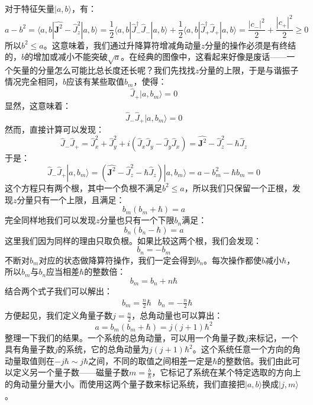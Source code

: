 \documentclass{ctexart}
\begin{document}
对于特征矢量$|a,b\rangle$，有：
\begin{equation}
a-b^2=\langle a,b|\hat{\bm{J}^2}-\hat{J}_z^2|a,b\rangle=\frac{1}{2}\langle a,b|\hat{J}_-^\dagger\hat{J}_-|a,b\rangle+\frac{1}{2}\langle a,b|\hat{J}_+^\dagger\hat{J}_+|a,b\rangle=\frac{|c_-|^2}{2}+\frac{|c_+|^2}{2}\geq 0
\end{equation}
所以$b^2\leq a$。这意味着，我们通过升降算符增减角动量$z$分量的操作必须是有终结的，$b$的增加或减小不能突破$\sqrt{a}$。在经典的图像中，这看起来好像是废话——一个矢量的分量怎么可能比总长度还长呢？我们先找找$z$分量的上限，于是与谐振子情况完全相同，$b$应该有某些取值$b_m$，使得：
\begin{equation}
\hat{J}_+|a,b_m\rangle=0
\end{equation}
显然，这意味着：
\begin{equation}
\hat{J}_-\hat{J}_+|a,b_m\rangle=0
\end{equation}
然而，直接计算可以发现：
\begin{equation}
\hat{J}_-\hat{J}_+=\hat{J}_x^2+\hat{J}_y^2+i(\hat{J}_x\hat{J}_y-\hat{J}_y\hat{J}_x)=\hat{\bm{J}^2}-\hat{J}_z^2-\hbar\hat{J}_z
\end{equation}
于是：
\begin{equation}
\hat{J}_-\hat{J}_+|a,b_m\rangle=(\hat{\bm{J}^2}-\hat{J}_z^2-\hbar\hat{J}_z)|a,b_m\rangle=a-b_m^2-\hbar b_m=0
\end{equation}
这个方程只有两个根，其中一个负根不满足$b^2\leq a$，所以我们只保留一个正根，发现$z$分量只有一个上限，且满足：
\begin{equation}
b_m(b_m+\hbar)=a
\end{equation}
完全同样地我们可以发现$z$分量也只有一个下限$b_n$满足：
\begin{equation}
b_n(b_n-\hbar)=a
\end{equation}
这里我们因为同样的理由只取负根。如果比较这两个根，我们会发现：
\begin{equation}
b_n=-b_m
\end{equation}
不断对$b_m$对应的状态做降算符操作，我们一定会得到$b_n$。每次操作都使$b$减小$\hbar$，所以$b_m$与$b_n$应当相差$\hbar$的整数倍：
\begin{equation}
b_m=b_n+n\hbar
\end{equation}
结合两个式子我们可以解出：
\begin{align}
&b_m=\frac{n}{2}\hbar   &b_n=-\frac{n}{2}\hbar
\end{align}
方便起见，我们定义角量子数$j=\frac{n}{2}$，总角动量也可以算出：
\begin{equation}
a=b_m(b_m+\hbar)=j(j+1)\hbar^2
\end{equation}
整理一下我们的结果。一个系统的总角动量，可以用一个角量子数$j$来标记，一个具有角量子数$j$的系统，它的总角动量为$j(j+1)\hbar^2$。这个系统任意一个方向的角动量取值则在$-j\hbar\sim j\hbar$之间，不同的取值之间相差一定是$\hbar$的整数倍。我们由此可以定义另一个量子数——磁量子数$m=\frac{b}{\hbar}$，它标记了系统在某个特定选取的方向上的角动量分量大小。而使用这两个量子数来标记系统，我们直接把$|a,b\rangle$换成$|j,m\rangle$。
\end{document}
